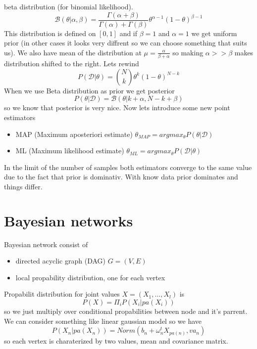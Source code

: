 \documentclass[12pt,a4paper]{article}
\begin{document}
beta distribution (for binomial likelihood).
\begin{equation}
    \mathcal{B}(\theta|\alpha,\beta)=\frac{\Gamma(\alpha+\beta)}{\Gamma(\alpha)+\Gamma(\beta)}\theta^{\alpha-1}(1-\theta)^{\beta-1}
\end{equation}
This distribution is defined on $[0,1]$ and if $\beta=1$ and $\alpha=1$ we get uniform prior (in other cases it looks very diffrent so we can choose something that suits us).
We also have mean of the distribution at $\mu=\frac{\alpha}{\beta+\alpha}$ so making $\alpha>>\beta$ makes distribution shifted to the right.
Lets rewind
\begin{equation}
    P(\mathcal{D}|\theta)={N\choose k}\theta^k(1-\theta)^{N-k}
\end{equation}
When we use Beta distribution as prior we get posterior
\begin{equation}
    P(\theta|\mathcal{D})=\mathcal{B}(\theta|k+\alpha,N-k+\beta)
\end{equation}
so we know that posterior is very nice.
Now lets introduce some new point estimators
\begin{itemize}
    \item MAP (Maximum aposteriori estimate) $\theta_{MAP}=argmax_{\theta}P(\theta|\mathcal{D})$
    \item ML (Maximum likelihood estimate) $\theta_{ML}=argmax_{\theta}P(\mathcal{D}|\theta)$
\end{itemize}
In the limit of the number of samples both estimators converge to the same value due to the fact that prior is dominativ. With know data prior dominates and things differ.
\section{Bayesian networks}
Bayesian network consist of 
\begin{itemize}
    \item directed acyclic graph (DAG) $G=(V,E)$
    \item local propability distribution, one for each vertex
\end{itemize}
Propabilit distribution for joint values $X=(X_1,\ldots,X_l)$ is
\begin{equation}
    P(X)=\Pi_{i} P(X_i|pa(X_i))
\end{equation}
so we just multiply over conditional propabilities between node and it's parrent.
We can consider something like linear gaussian model so we have 
\begin{equation}
    P(X_n|pa(X_{n}))=Norm(b_n+\omega_{n}^{t}X_{pa(n)},va_n)
\end{equation}
so each vertex is charaterized by two values, mean and covariance matrix.
\end{document}
